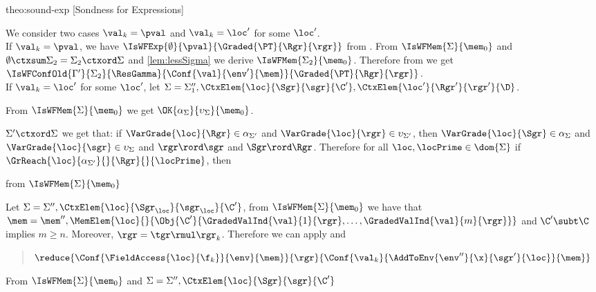 \begin{proofOf}{theo:sound-exp} [Sondness for Expressions]
\begin{description}
We consider two cases $\val_k=\pval$ and $\val_k=\loc'$ for some $\loc'$.\\ 
If $\val_k=\pval$, we have $\IsWFExp{\emptyset}{\pval}{\Graded{\PT}{\Rgr}{\rgr}}$ from .
From  $\IsWFMem{\Sigma}{\mem_0}$ and $\emptyset\ctxsum\Sigma_2=\Sigma_2\ctxord\Sigma$ and  \cref{lem:lessSigma} we derive  $\IsWFMem{\Sigma_2}{\mem_0}$.
Therefore from   we get $\IsWFConfOld{\Gamma'}{\Sigma_2}{\ResGamma}{\Conf{\val}{\env'}{\mem}}{\Graded{\PT}{\Rgr}{\rgr}}$. \\
If $\val_k=\loc'$ for some $\loc'$, let  $\Sigma=\Sigma_1'', \CtxElem{\loc}{\Sgr}{\sgr}{\C'},\CtxElem{\loc'}{\Rgr'}{\rgr'}{\D}$. 

From 
$\IsWFMem{\Sigma}{\mem_0}$ we get  $\OK{\alpha_\Sigma}{\upsilon_\Sigma}{\mem_0}$.



$\Sigma'\ctxord\Sigma$ we get that: if $\VarGrade{\loc}{\Rgr}\in\alpha_{\Sigma'}$  and $\VarGrade{\loc}{\rgr}\in\upsilon_{\Sigma'}$, then 
$\VarGrade{\loc}{\Sgr}\in\alpha_{\Sigma}$  and $\VarGrade{\loc}{\sgr}\in\upsilon_{\Sigma}$ and $\rgr\rord\sgr$ and $\Sgr\rord\Rgr$.
Therefore for all $\loc, \locPrime\in\dom{\Sigma}$ if $\GrReach{\loc}{\alpha_{\Sigma'}}{}{\Rgr}{}{\locPrime}$, then 

from  $\IsWFMem{\Sigma}{\mem_0}$ 


\bigskip

\epa

\bigskip
{}



Let
 $\Sigma=\Sigma'', \CtxElem{\loc}{\Sgr_\loc}{\sgr_\loc}{\C'}$,
from  $\IsWFMem{\Sigma}{\mem_0}$  we have that  
$\mem=\mem'',\MemElem{\loc}{}{\Obj{{\C'}}{\GradedValInd{\val}{1}{\rgr},\ldots,\GradedValInd{\val}{m}{\rgr}}}$ and $\C'\subt\C$ implies  $m\geq n$.
Moreover, 
$\rgr=\tgr\rmul\rgr_k$.
Therefore we can apply  and
\begin{quote}
$ \reduce{\Conf{\FieldAccess{\loc}{\f_k}}{\env}{\mem}}{\rgr}{\Conf{\val_k}{\AddToEnv{\env''}{\x}{\sgr'}{\loc}}{\mem}}$ 
\end{quote}
From  $\IsWFMem{\Sigma}{\mem_0}$ %
 and $\Sigma=\Sigma'', \CtxElem{\loc}{\Sgr}{\sgr}{\C'}$
 

\end{description}
\end{proofOf}
